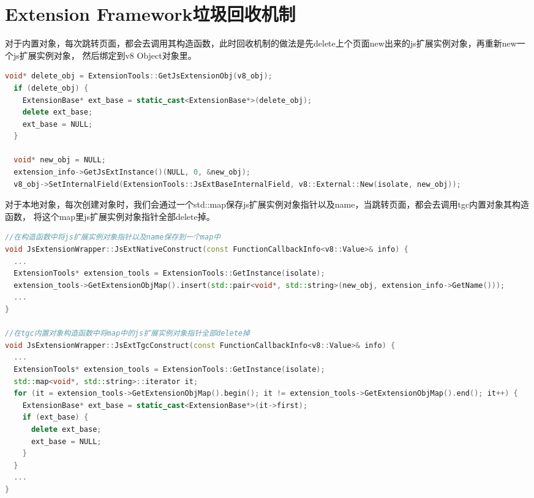 \section{Extension Framework垃圾回收机制}

对于内置对象，每次跳转页面，都会去调用其构造函数，此时回收机制的做法是先delete上个页面new出来的js扩展实例对象，再重新new一个js扩展实例对象，
然后绑定到v8 Object对象里。
\begin{spacing}{1.0}
\begin{lstlisting}[language={C++}]
void* delete_obj = ExtensionTools::GetJsExtensionObj(v8_obj);
  if (delete_obj) {
    ExtensionBase* ext_base = static_cast<ExtensionBase*>(delete_obj);
    delete ext_base;
    ext_base = NULL;
  }

  void* new_obj = NULL;
  extension_info->GetJsExtInstance()(NULL, 0, &new_obj);
  v8_obj->SetInternalField(ExtensionTools::JsExtBaseInternalField, v8::External::New(isolate, new_obj));
\end{lstlisting}
\end{spacing}

对于本地对象，每次创建对象时，我们会通过一个std::map保存js扩展实例对象指针以及name，当跳转页面，都会去调用tgc内置对象其构造函数，
将这个map里js扩展实例对象指针全部delete掉。
\begin{spacing}{1.0}
\begin{lstlisting}[language={C++}]
//在构造函数中将js扩展实例对象指针以及name保存到一个map中
void JsExtensionWrapper::JsExtNativeConstruct(const FunctionCallbackInfo<v8::Value>& info) {
  ...
  ExtensionTools* extension_tools = ExtensionTools::GetInstance(isolate);
  extension_tools->GetExtensionObjMap().insert(std::pair<void*, std::string>(new_obj, extension_info->GetName()));
  ...
}

//在tgc内置对象构造函数中将map中的js扩展实例对象指针全部delete掉
void JsExtensionWrapper::JsExtTgcConstruct(const FunctionCallbackInfo<v8::Value>& info) {
  ...
  ExtensionTools* extension_tools = ExtensionTools::GetInstance(isolate);
  std::map<void*, std::string>::iterator it;
  for (it = extension_tools->GetExtensionObjMap().begin(); it != extension_tools->GetExtensionObjMap().end(); it++) {
    ExtensionBase* ext_base = static_cast<ExtensionBase*>(it->first);
    if (ext_base) {
      delete ext_base;
      ext_base = NULL;
    }
  }
  ...
}
\end{lstlisting}
\end{spacing}




\ifx\withtbrowser\undefined
\else

\fi
